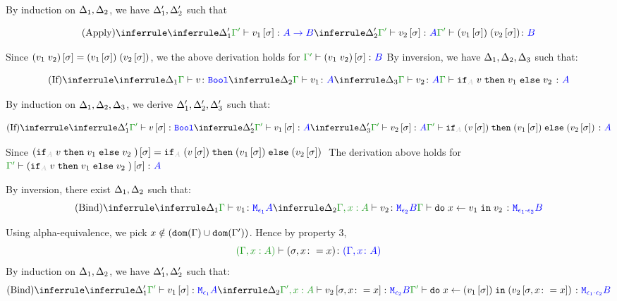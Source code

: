 \documentclass{report}
\begin{document}
    By induction on $\Delta_1, \Delta_2$, we have $\Delta_1',\Delta_2'$ such that

    \begin{equation}
        \ntreeruleII{Apply}{
            \treeruleI{\D'_1}{\typerelation{\G'}{v_1\ssi}{\ab}}
            }{
            \treeruleI{\D_2'}{\typerelation{\G'}{v_2\ssi}{A}}
        }{\typerelation{\G'}{\apply{(v_1\ssi)}{(v_2\ssi)}}{B}}
    \end{equation}

    Since $(v_1\; v_2)\left[\sigma\right] = (v_1\left[\sigma\right])\;(v_2\left[\sigma\right])$, we the above derivation holds for $\typerelation{\G'}{(\apply{v_1}{v_2})\ssi}{B}$
    By inversion, we have $\Delta_1,\Delta_2,\Delta_3$ such that:

    \begin{equation}
        \ntreeruleIII{If}{
            \treeruleI{\D_1}{\typerelation{\G}{v}{\B}}
            }{
            \treeruleI{\D_2}{\typerelation{\G}{v_1}{ A}}
            }{
            \treeruleI{\D_3}{\typerelation{\G}{v_2}{ A}}
        }{
            \typerelation{\G}{\pifthenelse{A}{v}{v_1}{v_2}}{ A}
        }
    \end{equation}

    By induction on $\Delta_1,\Delta_2, \Delta_3$, we derive 
    $\Delta_1', \Delta_2',\Delta_3'$ such that:
    
    \begin{equation}
        \ntreeruleIII{If}{
            \treeruleI{\D_1'}{\typerelation{\G'}{v\ssi}{\B}}
            }{
            \treeruleI{\D_2'}{\typerelation{\G'}{v_1\ssi}{ A}}
            }{
            \treeruleI{\D_3'}{\typerelation{\G'}{v_2\ssi}{ A}}
        }{
            \typerelation{\G'}{\pifthenelse{A}{(v\ssi)}{(v_1\ssi)}{(v_2\ssi)}}{ A}
        }
    \end{equation}

    Since $(\pifthenelse{A}{v}{v_1}{v_2})\ssi = \pifthenelse{A}{(v\ssi)}{(v_1\ssi)}{(v_2\ssi)}$ The derivation above holds for $\typerelation{\G'}{(\pifthenelse{A}{v}{v_1}{v_2})\ssi}{ A}$

    By inversion, there exist $\Delta_1, \Delta_2$ such that:
    \begin{equation}
        \ntreeruleII{Bind}{
            \treeruleI{\D_1}{\typerelation{\G}{v_1}{\M{\e_1}{A}}}
            }{
            \treeruleI{\D_2}{\typerelation{\G, x:A}{v_2}{\M{\e_2}{B}}}
        }{\typerelation{\G}{\doin{x}{v_1}{v_2}}{\M{\e_1\dot\e_2}{B}}}
    \end{equation}

    Using alpha-equivalence, we pick $x\notin(\texttt{dom}(\Gamma)\cup\texttt{dom}(\Gamma'))$. Hence by property 3, $$\typerelation{(\G, x: A)}{(\si, x\setto x)}{(\gax)}$$
    By induction on $\Delta_1, \Delta_2$, we have $\Delta_1', \Delta_2'$ such that:
    \begin{equation}
        \ntreeruleII{Bind}{
            \treeruleI{\D_1'}{\typerelation{\G'}{v_1\ssi}{\M{\e_1}{A}}}
            }{
            \treeruleI{\D_2}{\typerelation{\G', x:A}{v_2\sub{\si, x\setto x}}{\M{\e_2}{B}}}
        }{\typerelation{\G'}{\doin{x}{(v_1\ssi)}{(v_2\sub{\si, x\setto x})}}{\M{\e_1\dot\e_2}{B}}}
    \end{equation}
\end{document}
